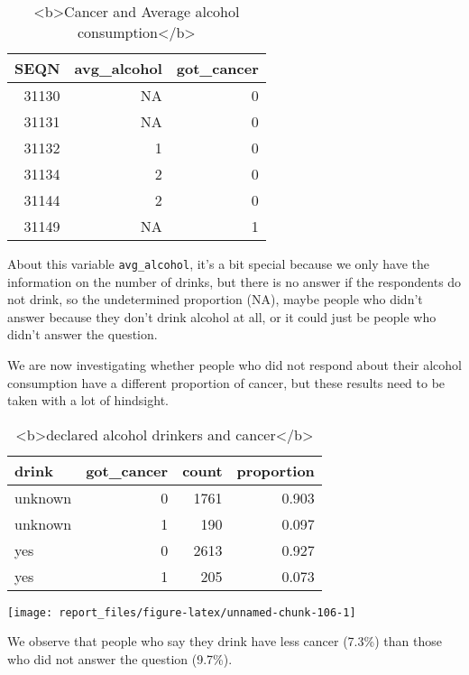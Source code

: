 \documentclass[
]{article}
\begin{document}
\begin{table}

\caption{\label{tab:unnamed-chunk-105}<b>Cancer and Average alcohol consumption</b>}
\centering
\begin{tabular}[t]{r|r|r}
\hline
SEQN & avg\_alcohol & got\_cancer\\
\hline
31130 & NA & 0\\
\hline
31131 & NA & 0\\
\hline
31132 & 1 & 0\\
\hline
31134 & 2 & 0\\
\hline
31144 & 2 & 0\\
\hline
31149 & NA & 1\\
\hline
\end{tabular}
\end{table}

About this variable \texttt{avg\_alcohol}, it's a bit special because we
only have the information on the number of drinks, but there is no
answer if the respondents do not drink, so the undetermined proportion
(NA), maybe people who didn't answer because they don't drink alcohol at
all, or it could just be people who didn't answer the question.

We are now investigating whether people who did not respond about their
alcohol consumption have a different proportion of cancer, but these
results need to be taken with a lot of hindsight.

\begin{table}

\caption{\label{tab:unnamed-chunk-106}<b>declared alcohol drinkers and cancer</b>}
\centering
\begin{tabular}[t]{l|r|r|r}
\hline
drink & got\_cancer & count & proportion\\
\hline
unknown & 0 & 1761 & 0.903\\
\hline
unknown & 1 & 190 & 0.097\\
\hline
yes & 0 & 2613 & 0.927\\
\hline
yes & 1 & 205 & 0.073\\
\hline
\end{tabular}
\end{table}

\begin{center}\texttt{[image: report\_files/figure-latex/unnamed-chunk-106-1]} \end{center}

We observe that people who say they drink have less cancer (7.3\%) than
those who did not answer the question (9.7\%).
\end{document}
